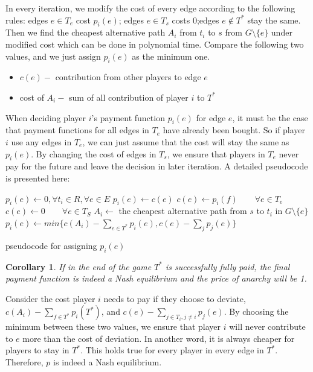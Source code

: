 \documentclass[11pt,psfig,times]{article}
\newtheorem{corollary}{Corollary}[section]
\begin{document}
In every iteration, we modify the cost of every edge according to the following rules: edges \(e \in T_e\) cost \(p_i(e)\); edges \(e \in T_s\) costs 0;edges \(e\notin T^*\) stay the same. Then we find the cheapest alternative path \(A_i\) from \(t_i\) to \(s\) from \(G \setminus \{e\}\) under modified cost which can be done in polynomial time. Compare the following two values, and we just assign $p_i(e)$ as the minimum one. 
		\begin{itemize}
			\item $c(e) - $ contribution from other players to edge \(e\)
			\item cost of \(A_i-\) sum of all contribution of player \(i\) to \(T^*\) 
		\end{itemize}

When deciding player $i$'s payment function $p_i(e)$ for edge $e$, it must be the case that payment functions for all edges in $T_e$ have already been bought. So if player $i$ use any edges in $T_e$, we can just assume that the cost will stay the same as $p_i(e)$. By changing the cost of edges in $T_s$, we ensure that players in $T_e$ never pay for the future and leave the decision in later iteration. A detailed pseudocode is presented here:
\begin{algorithm}[H]
	\begin{algorithmic}[1]
		\STATE $p_i(e) \gets 0, \forall t_i \in R, \forall e \in E$ 
		\STATE $p_i(e) \gets c(e)$
		\ELSE
		\STATE \(c(e) \gets p_i(f)  \qquad \forall e \in T_e\) 
		\STATE \(c(e) \gets 0 \qquad \forall e \in T_S\) 
		\STATE $A_i \gets$ the cheapest alternative path from \(s\) to \(t_i\) in $G\setminus\{e\}$ 
		\STATE \(p_i(e) \gets min\{c(A_i) - \sum_{e\in T^*}p_i(e), c(e)-\sum_{j}p_j(e) \}\)
		\ENDIF
		\ENDWHILE
	\end{algorithmic}
	\caption{pseudocode for assigning $p_i(e)$ }
	\label{alg:1}
	\end{algorithm}
	
\begin{corollary}
	If in the end of the game $T^*$ is successfully fully paid, the final payment function is indeed a Nash equilibrium and the price of anarchy will be 1.
\end{corollary}
Consider the cost player \(i\) needs to pay if they choose to deviate, \(c(A_i) - \sum_{f\in T^*}p_i(T^*)\), and \(c(e) - \sum_{j\in T_i,j\neq i}p_j(e)\). By choosing the minimum between these two values, we ensure that player \(i\) will never contribute to \(e\) more than the cost of deviation. In another word, it is always cheaper for players to stay in \(T^*\). This holds true for every player in every edge in $T^*$. Therefore, \(p\) is indeed a Nash equilibrium. 
\end{document}
